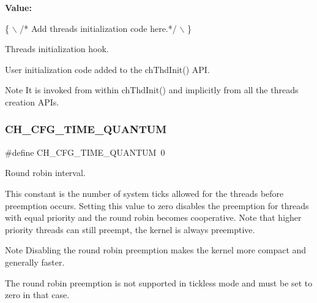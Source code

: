 {\bfseries Value\+:}
\begin{DoxyCode}
\{                                       \(\backslash\)
  \textcolor{comment}{/* Add threads initialization code here.*/}                                \(\backslash\)
\}
\end{DoxyCode}


Threads initialization hook. 

User initialization code added to the {\ttfamily ch\+Thd\+Init()} A\+PI.

\begin{DoxyNote}{Note}
It is invoked from within {\ttfamily ch\+Thd\+Init()} and implicitly from all the threads creation A\+P\+Is. 
\end{DoxyNote}
\hypertarget{group__config_ga20a364f069f854ccdba167f2cca2526f}{}\label{group__config_ga20a364f069f854ccdba167f2cca2526f} 
\subsubsection{\texorpdfstring{C\+H\+\_\+\+C\+F\+G\+\_\+\+T\+I\+M\+E\+\_\+\+Q\+U\+A\+N\+T\+UM}{CH\_CFG\_TIME\_QUANTUM}}
{\footnotesize\ttfamily \#define C\+H\+\_\+\+C\+F\+G\+\_\+\+T\+I\+M\+E\+\_\+\+Q\+U\+A\+N\+T\+UM~0}



Round robin interval. 

This constant is the number of system ticks allowed for the threads before preemption occurs. Setting this value to zero disables the preemption for threads with equal priority and the round robin becomes cooperative. Note that higher priority threads can still preempt, the kernel is always preemptive. \begin{DoxyNote}{Note}
Disabling the round robin preemption makes the kernel more compact and generally faster. 

The round robin preemption is not supported in tickless mode and must be set to zero in that case. 
\end{DoxyNote}
\hypertarget{group__config_ga73bc5a9da32221b5dd7759eed02a11fc}{}\label{group__config_ga73bc5a9da32221b5dd7759eed02a11fc} 
